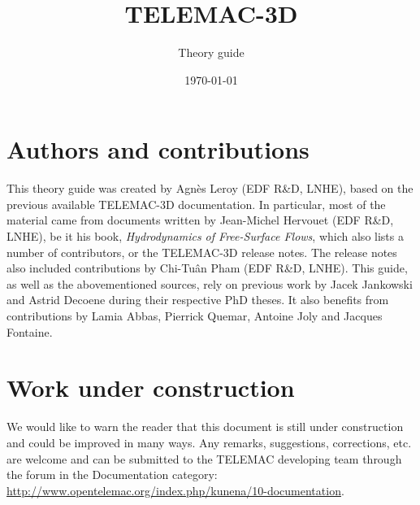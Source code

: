 \documentclass[Telemac3D]{../../data/TelemacDoc} %
\begin{document}
\let\cleardoublepage\clearpage
\title{TELEMAC-3D}
\subtitle{Theory guide}
\version{\telmaversion}
\author{}
\date{\today}
\maketitle
\clearpage


\newpage

\thispagestyle{empty}

\chapter*{Authors and contributions}
This theory guide was created by Agnès Leroy (EDF R\&D, LNHE), based on the previous available TELEMAC-3D
documentation. In particular, most of the material came from documents written by Jean-Michel
Hervouet (EDF R\&D, LNHE), be it his book, \textit{Hydrodynamics of Free-Surface Flows}, which also lists a number of contributors, or the
TELEMAC-3D release notes. The release notes also included contributions by Chi-Tuân Pham (EDF R\&D, LNHE).
This guide, as well as the abovementioned sources, rely on previous work by Jacek Jankowski and Astrid Decoene during their respective PhD theses.
It also benefits from contributions by Lamia Abbas, Pierrick Quemar, Antoine Joly and Jacques Fontaine.

\newpage

\chapter*{Work under construction}\label{workunderconstruction}
We would like to warn the reader that this document is still under construction and
could be improved in many ways. Any remarks, suggestions, corrections, etc. are welcome
and can be submitted to the TELEMAC developing team through the forum in the Documentation
category: \url{http://www.opentelemac.org/index.php/kunena/10-documentation}.

\newpage
\end{document}
